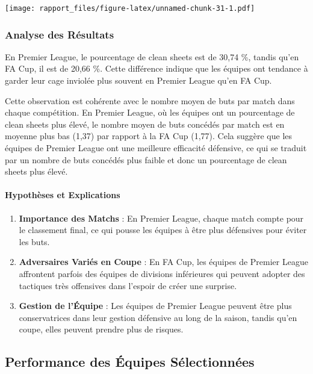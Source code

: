 \documentclass[
]{article}
\providecommand{\tightlist}{%
  \setlength{\itemsep}{0pt}\setlength{\parskip}{0pt}}
\begin{document}
\texttt{[image: rapport\_files/figure-latex/unnamed-chunk-31-1.pdf]}

\subsubsection{Analyse des Résultats}\label{analyse-des-ruxe9sultats-2}

En Premier League, le pourcentage de clean sheets est de 30,74 \%,
tandis qu'en FA Cup, il est de 20,66 \%. Cette différence indique que
les équipes ont tendance à garder leur cage inviolée plus souvent en
Premier League qu'en FA Cup.

Cette observation est cohérente avec le nombre moyen de buts par match
dans chaque compétition. En Premier League, où les équipes ont un
pourcentage de clean sheets plus élevé, le nombre moyen de buts concédés
par match est en moyenne plus bas (1,37) par rapport à la FA Cup (1,77).
Cela suggère que les équipes de Premier League ont une meilleure
efficacité défensive, ce qui se traduit par un nombre de buts concédés
plus faible et donc un pourcentage de clean sheets plus élevé.

\paragraph{Hypothèses et
Explications}\label{hypothuxe8ses-et-explications-1}

\begin{enumerate}
\def\labelenumi{\arabic{enumi}.}
\tightlist
\item
  \textbf{Importance des Matchs} : En Premier League, chaque match
  compte pour le classement final, ce qui pousse les équipes à être plus
  défensives pour éviter les buts.
\item
  \textbf{Adversaires Variés en Coupe} : En FA Cup, les équipes de
  Premier League affrontent parfois des équipes de divisions inférieures
  qui peuvent adopter des tactiques très offensives dans l'espoir de
  créer une surprise.
\item
  \textbf{Gestion de l'Équipe} : Les équipes de Premier League peuvent
  être plus conservatrices dans leur gestion défensive au long de la
  saison, tandis qu'en coupe, elles peuvent prendre plus de risques.
\end{enumerate}

\subsection{Performance des Équipes
Sélectionnées}\label{performance-des-uxe9quipes-suxe9lectionnuxe9es}
\end{document}
